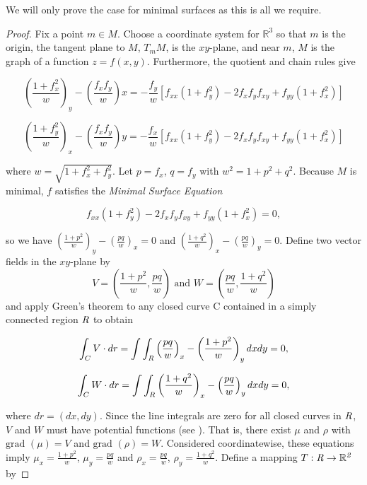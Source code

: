 We will only prove the case for minimal surfaces as this is all we require. 
\begin{proof}
\cite{OSS}
Fix a point $m \in M$. Choose a coordinate system for $\mathbb R^3$ so that $m$ is the origin, the tangent plane to $M$, $T_mM$, is the $xy$-plane, and near $m$, $M$ is the graph of a function $z=f(x,y)$. Furthermore, the quotient and chain rules give

\begin{displaymath}
\left(\frac{1+f_x^2}{w}\right)_y-\left(\frac{f_xf_y}{w}\right)x = -\frac{f_y}{w}\left[f_{xx}(1+f^2_y)-2f_xf_yf_{xy}+f_{yy}(1+f^2_x)\right]
\end{displaymath}

\begin{displaymath}
\left(\frac{1+f_y^2}{w}\right)_x-\left(\frac{f_xf_y}{w}\right)y = -\frac{f_x}{w}\left[f_{xx}(1+f^2_y)-2f_xf_yf_{xy}+f_{yy}(1+f^2_x)\right]
\end{displaymath}

where $w=\sqrt{1+f_x^2+f_y^2}$. Let $p=f_x$, $q=f_y$ with $w^2 = 1 + p^2 + q^2$. Because $M$ is minimal, $f$ satisfies the \emph{Minimal Surface Equation}

\begin{displaymath}
f_{xx}(1+f_y^2)-2f_xf_yf_{xy}+f_{yy}(1+f_x^2)=0,
\end{displaymath}

so we have $\left(\frac{1+p^2}{w}\right)_y - \left(\frac{pq}{w}\right)_x = 0$ and $\left(\frac{1+q^2}{w}\right)_x - \left(\frac{pq}{w}\right)_y = 0$. Define two vector fields in the $xy$-plane by
\begin{displaymath}
V=\left(\frac{1+p^2}{w},\frac{pq}{w}\right) \mbox{\ \ \ \ and \ \ \ \ } W=\left(\frac{pq}{w},\frac{1+q^2}{w}\right)
\end{displaymath}
and apply Green's theorem to any closed curve C contained in a simply connected region $\it{R}$ to obtain

\begin{displaymath}
\int_C V\cdot dr = \int \int_{\it{R}}\left(\frac{pq}{w}\right)_x-\left(\frac{1+p^2}{w}\right)_y dxdy=0,
\end{displaymath}

\begin{displaymath}
\int_C W\cdot dr = \int \int_{\it{R}}\left(\frac{1+q^2}{w}\right)_x - \left(\frac{pq}{w}\right)_y dxdy=0,
\end{displaymath}

where $dr = (dx,dy)$. Since the line integrals are zero for all closed curves in $\it R$, $V$ and $W$ must have potential functions (see \cite{MT}). That is, there exist $\mu$ and $\rho$  with $\mbox{grad }(\mu)= V$ and $\mbox{grad }(\rho) = W$. Considered coordinatewise, these equations imply $\mu_x = \frac{1+p^2}{w}$, $\mu_y=\frac{pq}{w}$ and $\rho_x = \frac{pq}{w}$, $\rho_y = \frac{1+q^2}{w}$. Define a mapping $T:\it R \rightarrow \mathbb R^2$ by


\end{proof}
